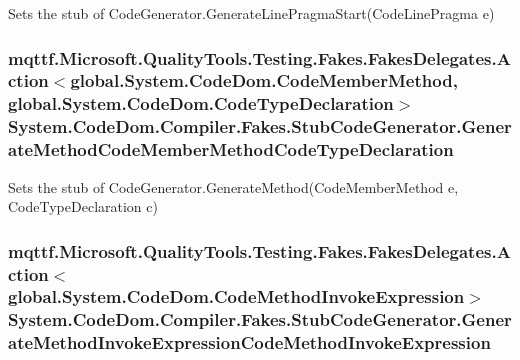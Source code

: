 Sets the stub of Code\-Generator.\-Generate\-Line\-Pragma\-Start(\-Code\-Line\-Pragma e)

\hypertarget{class_system_1_1_code_dom_1_1_compiler_1_1_fakes_1_1_stub_code_generator_aac10edfde1e658d056bb4d7e903afc1c}{
\subsubsection[{Generate\-Method\-Code\-Member\-Method\-Code\-Type\-Declaration}]{\setlength{\rightskip}{0pt plus 5cm}mqttf.\-Microsoft.\-Quality\-Tools.\-Testing.\-Fakes.\-Fakes\-Delegates.\-Action$<$global.\-System.\-Code\-Dom.\-Code\-Member\-Method, global.\-System.\-Code\-Dom.\-Code\-Type\-Declaration$>$ System.\-Code\-Dom.\-Compiler.\-Fakes.\-Stub\-Code\-Generator.\-Generate\-Method\-Code\-Member\-Method\-Code\-Type\-Declaration}}\label{class_system_1_1_code_dom_1_1_compiler_1_1_fakes_1_1_stub_code_generator_aac10edfde1e658d056bb4d7e903afc1c}


Sets the stub of Code\-Generator.\-Generate\-Method(\-Code\-Member\-Method e, Code\-Type\-Declaration c)

\hypertarget{class_system_1_1_code_dom_1_1_compiler_1_1_fakes_1_1_stub_code_generator_a612b7b08e0d0ca553564881236dd029d}{
\subsubsection[{Generate\-Method\-Invoke\-Expression\-Code\-Method\-Invoke\-Expression}]{\setlength{\rightskip}{0pt plus 5cm}mqttf.\-Microsoft.\-Quality\-Tools.\-Testing.\-Fakes.\-Fakes\-Delegates.\-Action$<$global.\-System.\-Code\-Dom.\-Code\-Method\-Invoke\-Expression$>$ System.\-Code\-Dom.\-Compiler.\-Fakes.\-Stub\-Code\-Generator.\-Generate\-Method\-Invoke\-Expression\-Code\-Method\-Invoke\-Expression}}\label{class_system_1_1_code_dom_1_1_compiler_1_1_fakes_1_1_stub_code_generator_a612b7b08e0d0ca553564881236dd029d}


